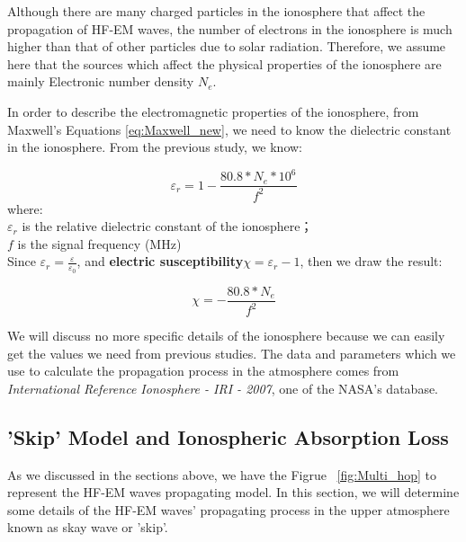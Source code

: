 \documentclass{mcmthesis}
\begin{document}
    Although there are many charged particles in the ionosphere that affect the propagation of HF-EM waves, the number of electrons in the ionosphere is much higher than that of other particles due to solar radiation. Therefore, we assume here that the sources which affect the physical properties of the ionosphere are mainly Electronic number density $N_{e}$.

    In order to describe the electromagnetic properties of the ionosphere, from Maxwell's Equations \ref{eq:Maxwell_new}, we need to know the dielectric constant in the ionosphere. From the previous study\cite{davies1990ionospheric}, we know:

      \begin{equation}\label{eq:relative_dielectric}
        \varepsilon_{r} = 1 - \frac{80.8 * N_{e} * 10^{6}}{f^{2}}
      \end{equation}
      where:\\
      $\varepsilon_{r}$ is the relative dielectric constant of the ionosphere；\\
      $f$ is the signal frequency (MHz) \\

    Since $\varepsilon_{r} = \frac{\varepsilon}{\varepsilon_{0}}$, and \textbf{electric susceptibility}$\chi = \varepsilon_{r} - 1$, then we draw the result:

      \begin{equation}\label{eq:chi}
        \chi = - \frac{80.8 * N_{e}}{f^{2}}
      \end{equation}




    We will discuss no more specific details of the ionosphere because we can easily get the values we need from previous studies. The data and parameters which we use to calculate the propagation process in the atmosphere comes from \emph{International Reference Ionosphere - IRI - 2007}\cite{NASAIonosphere}, one of the NASA's database.


  \subsection{'Skip' Model and Ionospheric Absorption Loss}

    As we discussed in the sections above, we have the Figrue ~\ref{fig:Multi_hop} to represent the HF-EM waves propagating model. In this section, we will determine some details of the HF-EM waves' propagating process in the upper atmosphere known as skay wave or 'skip'.
\end{document}
